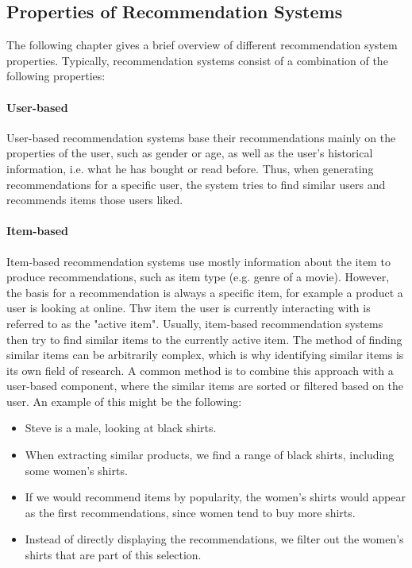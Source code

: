 \subsection{Properties of Recommendation Systems}
The following chapter gives a brief overview of different recommendation system properties.
Typically, recommendation systems consist of a combination of the following properties:
\paragraph{User-based}
User-based recommendation systems base their recommendations mainly on the properties of the user, such as gender or age, as well as the user's historical information, i.e. what he has bought or read before.
Thus, when generating recommendations for a specific user, the system tries to find similar users and recommends items those users liked.
\paragraph{Item-based}
Item-based recommendation systems use mostly information about the item to produce recommendations, such as item type (e.g. genre of a movie).
However, the basis for a recommendation is always a specific item, for example a product a user is looking at online.
Thw item the user is currently interacting with is referred to as the "active item". 
Usually, item-based recommendation systems then try to find similar items to the currently active item.
The method of finding similar items can be arbitrarily complex, which is why identifying similar items is its own field of research.
A common method is to combine this approach with a user-based component, where the similar items are sorted or filtered based on the user.
An example of this might be the following:
\begin{itemize}
    \item Steve is a male, looking at black shirts.
    \item When extracting similar products, we find a range of black shirts, including some women's shirts.
    \item If we would recommend items by popularity, the women's shirts would appear as the first recommendations, since women tend to buy more shirts.
    \item Instead of directly displaying the recommendations, we filter out the women's shirts that are part of this selection.
\end{itemize}
